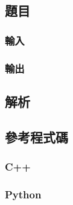 \documentclass[a4paper,10pt]{article}
\begin{document}
\subsection{題目}



\subsubsection{輸入}



\subsubsection{輸出}



\subsection{解析}



\subsection{參考程式碼}

\subsubsection{C++}

%

\subsubsection{Python}

%
\end{document}
